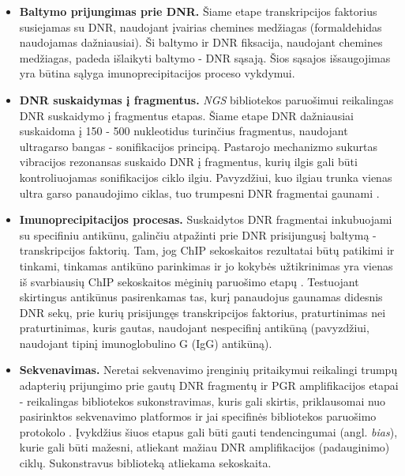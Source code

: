 \documentclass[12pt]{article}
\begin{document}
\begin{itemize}
    \item \textbf{Baltymo prijungimas prie DNR.} Šiame etape transkripcijos faktorius susiejamas su DNR, naudojant įvairias chemines medžiagas (formaldehidas naudojamas dažniausiai). Ši baltymo ir DNR fiksacija,
        naudojant chemines medžiagas, padeda išlaikyti baltymo - DNR
        sąsają. Šios sąsajos išsaugojimas yra būtina sąlyga imunoprecipitacijos
        proceso vykdymui.
    \item \textbf{DNR suskaidymas į fragmentus.} \emph{NGS} bibliotekos 
        paruošimui reikalingas DNR suskaidymo į fragmentus etapas. Šiame etape
        DNR dažniausiai suskaidoma į 150 - 500 nukleotidus turinčius fragmentus,
        naudojant ultragarso bangas - sonifikacijos principą. Pastarojo
        mechanizmo sukurtas vibracijos rezonansas suskaido DNR į fragmentus,
        kurių ilgis gali būti kontroliuojamas sonifikacijos ciklo ilgiu.
        Pavyzdžiui, kuo ilgiau trunka vienas ultra garso panaudojimo ciklas,
        tuo trumpesni DNR fragmentai gaunami \cite{SONICATION}.
    \item \textbf{Imunoprecipitacijos procesas.} Suskaidytos DNR fragmentai
        inkubuojami su specifiniu antikūnu, galinčiu atpažinti prie DNR
        prisijungusį baltymą - transkripcijos faktorių. Tam, jog ChIP
        sekoskaitos rezultatai būtų patikimi ir tinkami, tinkamas antikūno
        parinkimas ir jo kokybės užtikrinimas yra vienas iš svarbiausių ChIP
        sekoskaitos mėginių paruošimo etapų \cite{ARTICLE3}. Testuojant
        skirtingus antikūnus pasirenkamas tas, kurį panaudojus gaunamas
        didesnis DNR sekų, prie kurių prisijungęs transkripcijos faktorius,
        praturtinimas nei praturtinimas, kuris gautas, naudojant nespecifinį
        antikūną \cite{ARTICLE4} (pavyzdžiui, naudojant tipinį imunoglobulino G
        (IgG) antikūną).
    \item \textbf{Sekvenavimas.} Neretai sekvenavimo įrenginių pritaikymui
        reikalingi trumpų adapterių prijungimo prie gautų DNR fragmentų ir PGR
        amplifikacijos etapai - reikalingas bibliotekos sukonstravimas, kuris
        gali skirtis, priklausomai nuo pasirinktos sekvenavimo platformos
        ir jai specifinės bibliotekos paruošimo protokolo \cite{ARTICLE5}.
        Įvykdžius šiuos etapus gali būti gauti tendencingumai \cite{ARTICLE4}
        (angl. \emph{bias}), kurie gali būti mažesni, atliekant mažiau DNR
        amplifikacijos (padauginimo) ciklų. Sukonstravus biblioteką atliekama
        sekoskaita.
\end{itemize}
\end{document}
